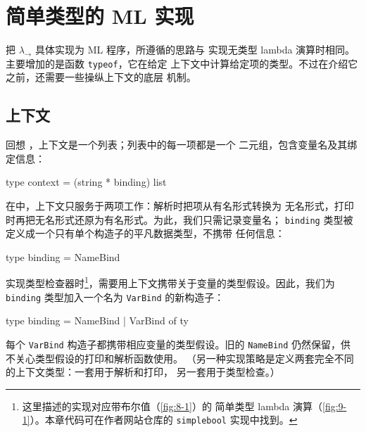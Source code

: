 
\chapter{简单类型的 ML 实现}
\label{chap:10}

把 \(\lambda_{\to}\) 具体实现为 ML 程序，所遵循的思路与
实现无类型 lambda 演算时相同。主要增加的是函数 \texttt{typeof}，它在给定
上下文中计算给定项的类型。不过在介绍它之前，还需要一些操纵上下文的底层
机制。


\section{上下文}
\label{sec:10.1}

回想 ，上下文是一个列表；列表中的每一项都是一个
二元组，包含变量名及其绑定信息：
\begin{taplocamlcode}
type context = (string * binding) list
\end{taplocamlcode}

在中，上下文只服务于两项工作：解析时把项从有名形式转换为
无名形式，打印时再把无名形式还原为有名形式。为此，我们只需记录变量名；
\texttt{binding} 类型被定义成一个只有单个构造子的平凡数据类型，不携带
任何信息：
\begin{taplocamlcode}
type binding = NameBind
\end{taplocamlcode}

实现类型检查器时\footnote{这里描述的实现对应带布尔值（\cref{fig:8-1}）的
简单类型 lambda 演算（\cref{fig:9-1}）。本章代码可在作者网站仓库的
\texttt{simplebool} 实现中找到。}，需要用上下文携带关于变量的类型假设。因此，我们为
\texttt{binding} 类型加入一个名为 \texttt{VarBind} 的新构造子：
\begin{taplocamlcode}
type binding =
    NameBind
  | VarBind of ty
\end{taplocamlcode}

每个 \texttt{VarBind} 构造子都携带相应变量的类型假设。旧的
\texttt{NameBind} 仍然保留，供不关心类型假设的打印和解析函数使用。
（另一种实现策略是定义两套完全不同的上下文类型：一套用于解析和打印，
另一套用于类型检查。）

